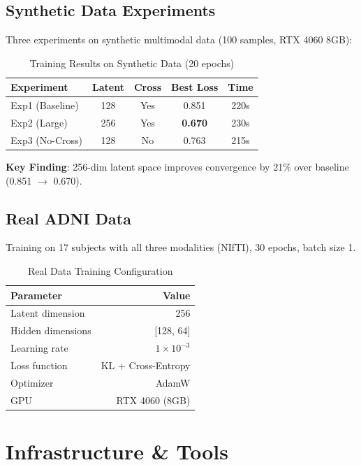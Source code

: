 \documentclass[11pt,a4paper]{article}
\begin{document}
\subsection{Synthetic Data Experiments}
Three experiments on synthetic multimodal data (100 samples, RTX 4060 8GB):

\begin{table}[H]
\centering
\caption{Training Results on Synthetic Data (20 epochs)}
\begin{tabular}{lcccc}
\toprule
\textbf{Experiment} & \textbf{Latent} & \textbf{Cross} & \textbf{Best Loss} & \textbf{Time} \\
\midrule
Exp1 (Baseline) & 128 & Yes & 0.851 & 220s \\
Exp2 (Large)    & 256 & Yes & \textbf{0.670} & 230s \\
Exp3 (No-Cross) & 128 & No  & 0.763 & 215s \\
\bottomrule
\end{tabular}
\end{table}

\textbf{Key Finding}: 256-dim latent space improves convergence by 21\% over baseline (0.851 $\rightarrow$ 0.670).

\subsection{Real ADNI Data}
Training on 17 subjects with all three modalities (NIfTI), 30 epochs, batch size 1.

\begin{table}[H]
\centering
\caption{Real Data Training Configuration}
\begin{tabular}{lr}
\toprule
\textbf{Parameter} & \textbf{Value} \\
\midrule
Latent dimension & 256 \\
Hidden dimensions & [128, 64] \\
Learning rate & $1\times10^{-3}$ \\
Loss function & KL + Cross-Entropy \\
Optimizer & AdamW \\
GPU & RTX 4060 (8GB) \\
\bottomrule
\end{tabular}
\end{table}

\section{Infrastructure \& Tools}
\end{document}
